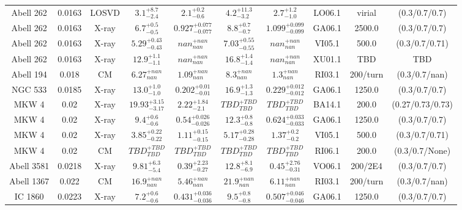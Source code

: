 \begin{table}
\begin{tabular}{cccccccccc}
Abell 262 & 0.0163 & LOSVD & ${3.1}^{+8.7}_{-2.4}$ & ${2.1}^{+0.2}_{-0.6}$ & ${4.2}^{+11.3}_{-3.2}$ & ${2.7}^{+1.2}_{-1.0}$ & LO06.1 & virial & (0.3/0.7/0.7) \\
Abell 262 & 0.0163 & X-ray & ${6.7}^{+0.5}_{-0.5}$ & ${0.927}^{+0.077}_{-0.077}$ & ${8.8}^{+0.7}_{-0.7}$ & ${1.099}^{+0.099}_{-0.099}$ & GA06.1 & 2500.0 & (0.3/0.7/0.7) \\
Abell 262 & 0.0163 & X-ray & ${5.29}^{+0.43}_{-0.43}$ & ${nan}^{+nan}_{nan}$ & ${7.03}^{+0.55}_{-0.55}$ & ${nan}^{+nan}_{nan}$ & VI05.1 & 500.0 & (0.3/0.7/0.71) \\
Abell 262 & 0.0163 & X-ray & ${12.9}^{+1.1}_{-1.1}$ & ${nan}^{+nan}_{nan}$ & ${16.8}^{+1.4}_{-1.4}$ & ${nan}^{+nan}_{nan}$ & XU01.1 & TBD & TBD \\
Abell 194 & 0.018 & CM & ${6.27}^{+nan}_{nan}$ & ${1.09}^{+nan}_{nan}$ & ${8.3}^{+nan}_{nan}$ & ${1.3}^{+nan}_{nan}$ & RI03.1 & 200/turn & (0.3/0.7/nan) \\
NGC 533 & 0.0185 & X-ray & ${13.0}^{+1.0}_{-1.0}$ & ${0.202}^{+0.01}_{-0.01}$ & ${16.9}^{+1.3}_{-1.3}$ & ${0.229}^{+0.012}_{-0.012}$ & GA06.1 & 1250.0 & (0.3/0.7/0.7) \\
MKW 4 & 0.02 & X-ray & ${19.93}^{+3.15}_{-3.17}$ & ${2.22}^{+1.84}_{-2.1}$ & ${TBD}^{+TBD}_{TBD}$ & ${TBD}^{+TBD}_{TBD}$ & BA14.1 & 200.0 & (0.27/0.73/0.73) \\
MKW 4 & 0.02 & X-ray & ${9.4}^{+0.6}_{-0.6}$ & ${0.54}^{+0.026}_{-0.026}$ & ${12.3}^{+0.8}_{-0.8}$ & ${0.624}^{+0.033}_{-0.033}$ & GA06.1 & 1250.0 & (0.3/0.7/0.7) \\
MKW 4 & 0.02 & X-ray & ${3.85}^{+0.22}_{-0.22}$ & ${1.11}^{+0.15}_{-0.15}$ & ${5.17}^{+0.28}_{-0.28}$ & ${1.37}^{+0.2}_{-0.2}$ & VI05.1 & 500.0 & (0.3/0.7/0.71) \\
MKW 4 & 0.02 & CM & ${TBD}^{+TBD}_{TBD}$ & ${TBD}^{+TBD}_{TBD}$ & ${TBD}^{+TBD}_{TBD}$ & ${TBD}^{+TBD}_{TBD}$ & RI06.1 & 200.0 & (0.3/0.7/None) \\
Abell 3581 & 0.0218 & X-ray & ${9.81}^{+6.3}_{-5.4}$ & ${0.39}^{+2.23}_{-0.27}$ & ${12.8}^{+8.1}_{-6.9}$ & ${0.45}^{+2.76}_{-0.31}$ & VO06.1 & 200/2E4 & (0.3/0.7/0.7) \\
Abell 1367 & 0.022 & CM & ${16.9}^{+nan}_{nan}$ & ${5.46}^{+nan}_{nan}$ & ${21.9}^{+nan}_{nan}$ & ${6.11}^{+nan}_{nan}$ & RI03.1 & 200/turn & (0.3/0.7/nan) \\
IC 1860 & 0.0223 & X-ray & ${7.2}^{+0.6}_{-0.6}$ & ${0.431}^{+0.036}_{-0.036}$ & ${9.5}^{+0.8}_{-0.8}$ & ${0.507}^{+0.046}_{-0.046}$ & GA06.1 & 1250.0 & (0.3/0.7/0.7) \\

\end{tabular}
\end{table}
